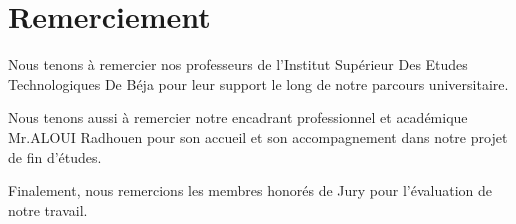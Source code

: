 
\chapter*{Remerciement}
Nous tenons à remercier nos professeurs de l'Institut Supérieur Des Etudes Technologiques De Béja pour leur support le long de notre parcours universitaire.

Nous tenons aussi à remercier notre encadrant professionnel et académique Mr.ALOUI Radhouen pour son accueil et son accompagnement dans notre projet de fin d'études.

Finalement, nous remercions les membres honorés de Jury pour l'évaluation de notre travail.
